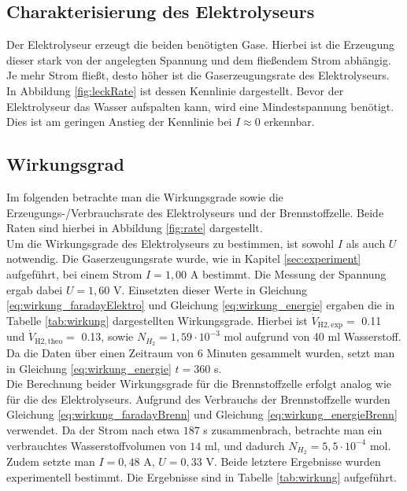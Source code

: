 \documentclass[a4paper,usenatbib]{aspdoc}
\begin{document}
            
        \subsection{Charakterisierung des Elektrolyseurs}\label{subsec:char_elektro}
            Der Elektrolyseur erzeugt die beiden benötigten Gase. Hierbei ist die Erzeugung dieser stark von der angelegten Spannung und dem fließendem Strom abhängig. Je mehr Strom fließt, desto höher ist die Gaserzeugungsrate des Elektrolyseurs. In Abbildung \ref{fig:leckRate} ist dessen Kennlinie dargestellt. Bevor der Elektrolyseur das Wasser aufspalten kann, wird eine Mindestspannung benötigt. Dies ist am geringen Anstieg der Kennlinie bei $I \approx 0$ erkennbar.  
        
        
        \subsection{Wirkungsgrad}\label{subsec:wirkung}
            Im folgenden betrachte man die Wirkungsgrade sowie die Erzeugungs-/Verbrauchsrate des Elektrolyseurs und der Brennstoffzelle. Beide Raten sind hierbei in Abbildung \ref{fig:rate} dargestellt.
            \\
            Um die Wirkungsgrade des Elektrolyseurs zu bestimmen, ist sowohl $I$ als auch $U$ notwendig. Die Gaserzeugungsrate wurde, wie in Kapitel \ref{sec:experiment} aufgeführt, bei einem Strom $I = 1,00$ A bestimmt. Die Messung der Spannung ergab dabei $U = 1,60$ V. Einsetzten dieser Werte in Gleichung \ref{eq:wirkung_faradayElektro} und Gleichung \ref{eq:wirkung_energie} ergaben die in Tabelle \ref{tab:wirkung} dargestellten Wirkungsgrade.
            Hierbei ist $\dot{V}_{\mathrm{H2, exp}} = $ \SI{0,11}{} und $\dot{V}_{\mathrm{H2, theo}} = $ \SI{0,13}{}, sowie $N_{H_{2}} = 1,59 \cdot 10^{-3}$ mol aufgrund von 40 ml Wasserstoff. Da die Daten über einen Zeitraum von 6 Minuten gesammelt wurden, setzt man in Gleichung \ref{eq:wirkung_energie} $t = 360$ s.
            \\ 
            Die Berechnung beider Wirkungsgrade für die Brennstoffzelle erfolgt analog wie für die des Elektrolyseurs. Aufgrund des Verbrauchs der Brennstoffzelle wurden Gleichung \ref{eq:wirkung_faradayBrenn} und Gleichung \ref{eq:wirkung_energieBrenn} verwendet. Da der Strom nach etwa $187$ s zusammenbrach, betrachte man ein verbrauchtes Wasserstoffvolumen von $14$ ml, und dadurch $N_{H_{2}} = 5,5 \cdot 10^{-4}$ mol. Zudem setzte man $I = 0,48$ A, $U = 0,33$ V. Beide letztere Ergebnisse wurden experimentell bestimmt. Die Ergebnisse sind in Tabelle \ref{tab:wirkung} aufgeführt.
            
\end{document}

